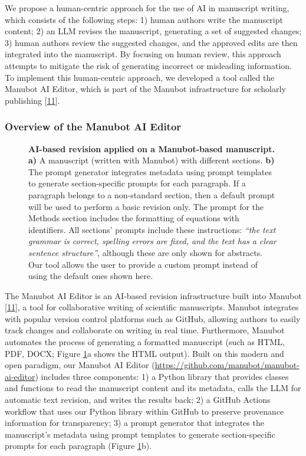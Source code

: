 \documentclass[
]{article}
\begin{document}
We propose a human-centric approach for the use of AI in manuscript writing, which consists of the following steps:
1) human authors write the manuscript content;
2) an LLM revises the manuscript, generating a set of suggested changes;
3) human authors review the suggested changes, and the approved edits are then integrated into the manuscript.
By focusing on human review, this approach attempts to mitigate the risk of generating incorrect or misleading information.
To implement this human-centric approach, we developed a tool called the Manubot AI Editor, which is part of the Manubot infrastructure for scholarly publishing {[}\protect\hyperlink{ref-YuJbg3zO}{11}{]}.

\hypertarget{overview-of-the-manubot-ai-editor}{%
\subsubsection{Overview of the Manubot AI Editor}\label{overview-of-the-manubot-ai-editor}}

\begin{figure}
\hypertarget{fig:ai_revision}{%
\centering

\caption{\textbf{AI-based revision applied on a Manubot-based manuscript.}
\textbf{a)} A manuscript (written with Manubot) with different sections.
\textbf{b)} The prompt generator integrates metadata using prompt templates to generate section-specific prompts for each paragraph.
If a paragraph belongs to a non-standard section, then a default prompt will be used to perform a basic revision only.
The prompt for the Methods section includes the formatting of equations with identifiers.
All sections' prompts include these instructions: \emph{``the text grammar is correct, spelling errors are fixed, and the text has a clear sentence structure''}, although these are only shown for abstracts.
Our tool allows the user to provide a custom prompt instead of using the default ones shown here.}\label{fig:ai_revision}
}
\end{figure}

The Manubot AI Editor is an AI-based revision infrastructure built into Manubot {[}\protect\hyperlink{ref-YuJbg3zO}{11}{]}, a tool for collaborative writing of scientific manuscripts.
Manubot integrates with popular version control platforms such as GitHub, allowing authors to easily track changes and collaborate on writing in real time.
Furthermore, Manubot automates the process of generating a formatted manuscript (such as HTML, PDF, DOCX; Figure \ref{fig:ai_revision}a shows the HTML output).
Built on this modern and open paradigm, our Manubot AI Editor (\url{https://github.com/manubot/manubot-ai-editor}) includes three components:
1) a Python library that provides classes and functions to read the manuscript content and its metadata, calls the LLM for automatic text revision, and writes the results back;
2) a GitHub Actions workflow that uses our Python library within GitHub to preserve provenance information for transparency;
3) a prompt generator that integrates the manuscript's metadata using prompt templates to generate section-specific prompts for each paragraph (Figure \ref{fig:ai_revision}b).
\end{document}
